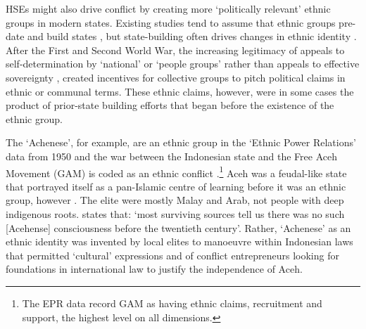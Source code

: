 HSEs might also drive conflict by creating more `politically relevant' ethnic
groups in modern states. Existing studies tend to assume that ethnic groups
pre-date and build states \citep{Paine2019, Wig2016}, but state-building often
drives changes in ethnic identity \citep{Anderson2006, Chandra2006, Wimmer2018}.
After the First and Second World War, the increasing legitimacy of appeals to
self-determination by `national' or `people groups' rather than appeals to
effective sovereignty \citep{Clapham1996, Jackson1991}, created incentives for
collective groups to pitch political claims in ethnic or communal terms. These
ethnic claims, however, were in some cases the product of prior-state building
efforts that began before the existence of the ethnic group. 

The `Achenese', for example, are an ethnic group in the `Ethnic Power Relations'
data from 1950 \citep{Vogt2015} and the war between the Indonesian state and the
Free Aceh Movement (GAM) is coded as an ethnic conflict
\citep{Vogt2015}.\footnote{The EPR data record GAM as having ethnic claims,
recruitment and support, the highest level on all dimensions.} Aceh was a feudal-like state that portrayed itself as a pan-Islamic centre of learning before it was an ethnic group, however \citep[20]{Aspinall2009}.
The elite were mostly Malay and Arab, not people with deep indigenous roots.
\citet[46-47]{Aspinall2009} states that: `most surviving sources tell us there
was no such [Acehense] consciousness before the twentieth century'. Rather,
`Achenese' as an ethnic identity was invented by local elites to manoeuvre
within Indonesian laws that permitted `cultural' expressions and of conflict
entrepreneurs looking for foundations in international law to justify the
independence of Aceh. 

